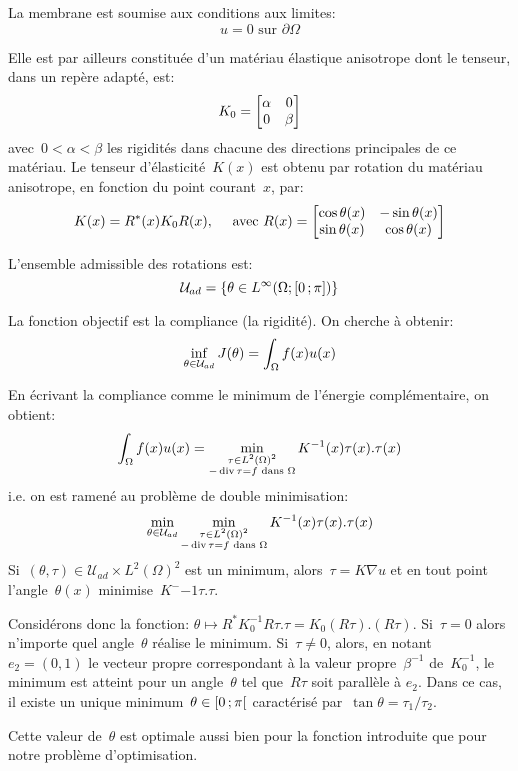 La membrane est soumise aux conditions aux limites:
\[ u=0 \text{ sur }\partial\Omega \]

Elle est par ailleurs constituée d'un matériau élastique anisotrope dont le tenseur, dans un repère adapté, est:
\[ K_0 = \MM*{\alpha & 0\\0 &\beta} \]
avec~$0<\alpha<\beta$ les rigidités dans chacune des directions principales de ce matériau. Le tenseur d'élasticité~$K(x)$ est obtenu par rotation du matériau anisotrope, en fonction du point courant~$x$, par:
\[ K(x)=R^*(x)K_0R(x), \quad \text{ avec } R(x)=\MM*{\cos\theta(x) &-\sin\theta(x)\\ \sin\theta(x) & \cos\theta(x)} \]


L'ensemble admissible des rotations est:
\[ \mathcal{U}_{ad}=\{\theta\in L^\infty(\Omega;\mathopen{[}0\,;\pi\mathclose{]}) \} \]

\medskip
La fonction objectif est la compliance (la rigidité). On cherche à obtenir:
\[ \colorblue \inf_{\theta\in\mathcal{U}_{ad}} J(\theta)=\dint_\Omega f(x)u(x) \]

\medskip
En écrivant la compliance comme le minimum de l'énergie complémentaire, on obtient:
\[ \displaystyle\int_\Omega f(x)u(x) = \min_{\substack{\tau\in L^2(\Omega)^2\\ -\operatorname{div}\tau=f \text{ dans }\Omega}} K^{-1}(x)\tau(x).\tau(x) \]
i.e. on est ramené au problème de double minimisation:
\[ \min_{\theta\in\mathcal{U}_{ad}} \min_{\substack{\tau\in L^2(\Omega)^2\\ -\operatorname{div}\tau=f \text{ dans }\Omega}} K^{-1}(x)\tau(x).\tau(x)
\]
Si~$(\theta,\tau)\in\mathcal{U}_{ad}\times L^2(\Omega)^2$ est un minimum, alors~$\tau=K\nabla u$ et en tout point l'angle~$\theta(x)$ minimise~$K^-{-1}\tau.\tau$.

Considérons donc la fonction: $\theta \mapsto R^*K_0^{-1}R\tau.\tau=K_0(R\tau).(R\tau)$.
Si~$\tau=0$ alors n'importe quel angle~$\theta$ réalise le minimum.
Si~$\tau\ne0$, alors, en notant~$e_2=(0,1)$ le vecteur propre correspondant à la valeur propre~$\beta^{-1}$ de~$K_0^{-1}$, le minimum est atteint pour un angle~$\theta$ tel que~$R\tau$ soit parallèle à $e_2$. Dans ce cas, il existe un unique minimum~$\theta\in\mathopen{[}0\,;\pi\mathclose{[}$ caractérisé par~$\tan\theta=\tau_1/\tau_2$.

Cette valeur de~$\theta$ est optimale aussi bien pour la fonction introduite que pour notre problème d'optimisation.

